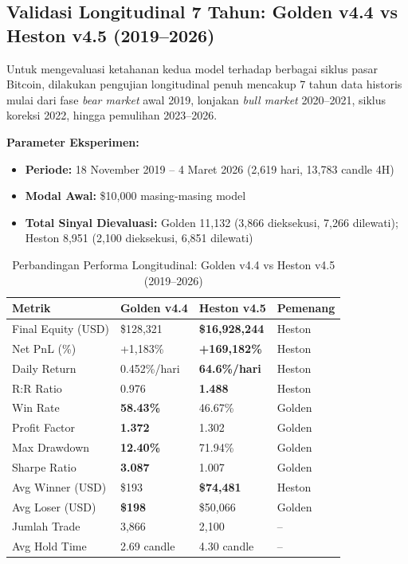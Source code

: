 \subsection{Validasi Longitudinal 7 Tahun: Golden v4.4 vs Heston v4.5 (2019--2026)}
\label{subsec:longitudinal_7y}

Untuk mengevaluasi ketahanan kedua model terhadap berbagai siklus pasar Bitcoin, dilakukan pengujian longitudinal penuh mencakup 7 tahun data historis mulai dari fase \textit{bear market} awal 2019, lonjakan \textit{bull market} 2020--2021, siklus koreksi 2022, hingga pemulihan 2023--2026.

\textbf{Parameter Eksperimen:}
\begin{itemize}
    \item \textbf{Periode:} 18 November 2019 -- 4 Maret 2026 (2,619 hari, 13,783 candle 4H)
    \item \textbf{Modal Awal:} \$10,000 masing-masing model
    \item \textbf{Total Sinyal Dievaluasi:} Golden 11,132 (3,866 dieksekusi, 7,266 dilewati); Heston 8,951 (2,100 dieksekusi, 6,851 dilewati)
\end{itemize}

\begin{table}[h!]
\centering
\caption{Perbandingan Performa Longitudinal: Golden v4.4 vs Heston v4.5 (2019--2026)}
\label{table:longitudinal_7y}
\begin{tabular}{@{}llll@{}}
\toprule
\textbf{Metrik}          & \textbf{Golden v4.4} & \textbf{Heston v4.5}   & \textbf{Pemenang} \\ \midrule
Final Equity (USD)       & \$128,321            & \textbf{\$16,928,244}  & Heston \\
Net PnL (\%)             & +1,183\%             & \textbf{+169,182\%}    & Heston \\
Daily Return             & 0.452\%/hari         & \textbf{64.6\%/hari}   & Heston \\
R:R Ratio                & 0.976                & \textbf{1.488}         & Heston \\
Win Rate                 & \textbf{58.43\%}     & 46.67\%                & Golden \\
Profit Factor            & \textbf{1.372}       & 1.302                  & Golden \\
Max Drawdown             & \textbf{12.40\%}     & 71.94\%                & Golden \\
Sharpe Ratio             & \textbf{3.087}       & 1.007                  & Golden \\
Avg Winner (USD)         & \$193                & \textbf{\$74,481}      & Heston \\
Avg Loser (USD)          & \textbf{\$198}       & \$50,066               & Golden \\
Jumlah Trade             & 3,866                & 2,100                  & -- \\
Avg Hold Time            & 2.69 candle          & 4.30 candle            & -- \\
\bottomrule
\end{tabular}
\end{table}

